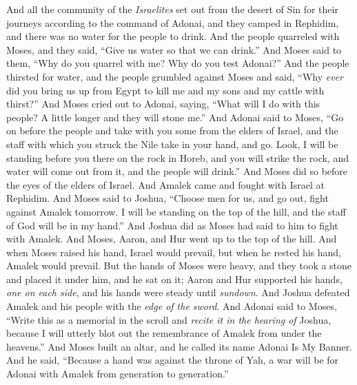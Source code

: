 \begin{biblechapter} %
 And all the community of the \textit{Israelites} set out from the desert of Sin for their journeys according to the command of Adonai, and they camped in Rephidim, and there was no water for the people to drink.
\verse And the people quarreled with Moses, and they said, “Give us water so that we can drink.” And Moses said to them, “Why do you quarrel with me? Why do you test Adonai?”
\verse And the people thirsted for water, and the people grumbled against Moses and said, “Why \textit{ever} did you bring us up from Egypt to kill me and my sons and my cattle with thirst?”
\verse And Moses cried out to Adonai, saying, “What will I do with this people? A little longer and they will stone me.”
\verse And Adonai said to Moses, “Go on before the people and take with you some from the elders of Israel, and the staff with which you struck the Nile take in your hand, and go.
\verse Look, I will be standing before you there on the rock in Horeb, and you will strike the rock, and water will come out from it, and the people will drink.”
\verse And Moses did so before the eyes of the elders of Israel.
 And Amalek came and fought with Israel at Rephidim.
\verse And Moses said to Joshua, “Choose men for us, and go out, fight against Amalek tomorrow. I will be standing on the top of the hill, and the staff of God will be in my hand.”
\verse And Joshua did as Moses had said to him to fight with Amalek. And Moses, Aaron, and Hur went up to the top of the hill.
\verse And when Moses raised his hand, Israel would prevail, but when he rested his hand, Amalek would prevail.
\verse But the hands of Moses were heavy, and they took a stone and placed it under him, and he sat on it; Aaron and Hur supported his hands, \textit{one on each side}, and his hands were steady until \textit{sundown}.
\verse And Joshua defeated Amalek and his people with the \textit{edge of the sword}.
\verse And Adonai said to Moses, “Write this as a memorial in the scroll and \textit{recite it in the hearing of} Joshua, because I will utterly blot out the remembrance of Amalek from under the heavens.”
\verse And Moses built an altar, and he called its name Adonai Is My Banner.
\verse And he said, “Because a hand was against the throne of Yah, a war will be for Adonai with Amalek from generation to generation.”
\end{biblechapter}


